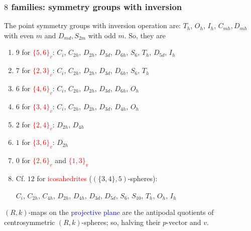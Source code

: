 \documentclass{beamer}
\begin{document}
\begin{frame}\frametitle{$8$ families: symmetry  groups with inversion}
\vspace{-1mm}
The point symmetry groups with  inversion operation are:
$T_h$, $O_h$, $I_h$,
$C_{mh},D_{mh}$ with even $m$ and $D_{md},S_{2m}$ with odd $m$. So, they are
\begin{enumerate}
\item[\ding{108}] $9$ for \textcolor{red}{$\{5,6\}_v$}:
$C_i$, $C_{2h}$, $D_{2h}$, $D_{3d}$, $D_{6h}$, $S_6$, $T_h$, $D_{5d}$, $I_h$
\item[\ding{108}] $7$ for \textcolor{red}{$\{2, 3\}_v$}:  $C_i$, $C_{2h}$,
  $D_{2h}$, $D_{3d}$, $D_{6h}$,  $S_6$, $T_h$
\item[\ding{108}] $6$ for \textcolor{red}{$\{4,6\}_v$}:
$C_{i}$, $C_{2h}$, $D_{2h}$, $D_{3d}$, $D_{6h}$, $O_h$  
\item[\ding{108}] $6$ for \textcolor{red}{$\{3, 4\}_v$}:
$C_i$, $C_{2h}$, $D_{2h}$, $D_{3d}$, $D_{4h}$,  $O_h$
\item[\ding{108}] $2$ for \textcolor{red}{$\{2, 4\}_v$}: $D_{2h}$, $D_{4h}$
\item[\ding{108}] $1$ for \textcolor{red}{$\{3,6\}_v$}: $D_{2h}$

\item[\ding{108}] $0$ for  \textcolor{red}{$\{2, 6\}_v$} and \textcolor{red}{$\{1, 
3\}_v$}

\item[\ding{108}] 
 Cf. $12$ for \textcolor{red}{icosahedrites} ($(\{3,4\},5)$-spheres):

$C_i$, $C_{2h}$, $C_{4h}$, $D_{2h}$, $D_{4h}$, $D_{3d}$, $D_{5d}$, $S_6$, $S_{10}$, $T_h$, $O_{h}$, 
$I_h$

\end{enumerate}   
\vspace{2mm}

$(R,k)$-maps on the \textcolor{blue}{projective plane} are
 the antipodal quotients of  centrosymmetric $(R,k)$-spheres; so, halving their
$p$-vector and $v$.

\end{frame}
\end{document}
